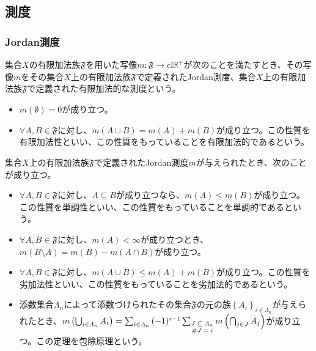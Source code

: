 \documentclass[dvipdfmx]{jsarticle}
\begin{document}
\subsection{測度}%
\subsubsection{Jordan測度}%
\begin{axs}[Jordan測度の公理]
集合$X$の有限加法族$\mathfrak{F}$を用いた写像$m:\mathfrak{F \rightarrow}\mathrm{cl}\mathbb{R}^{+}$が次のことを満たすとき、その写像$m$をその集合$X$上の有限加法族$\mathfrak{F}$で定義されたJordan測度、集合$X$上の有限加法族$\mathfrak{F}$で定義された有限加法的な測度という。
\begin{itemize}
\item
  $m(\emptyset) = 0$が成り立つ。
\item
  $\forall A,B \in \mathfrak{F}$に対し、$m(A \sqcup B) = m(A) + m(B)$が成り立つ。この性質を有限加法性といい、この性質をもっていることを有限加法的であるという。
\end{itemize}
\end{axs}
\begin{thm}\label{4.5.3.1}
集合$X$上の有限加法族$\mathfrak{F}$で定義されたJordan測度$m$が与えられたとき、次のことが成り立つ。
\begin{itemize}
\item
  $\forall A,B \in \mathfrak{F}$に対し、$A \subseteq B$が成り立つなら、$m(A) \leq m(B)$が成り立つ。この性質を単調性といい、この性質をもっていることを単調的であるという。
\item
  $\forall A,B \in \mathfrak{F}$に対し、$m(A) < \infty$が成り立つとき、$m(B \setminus A) = m(B) - m(A \cap B)$が成り立つ。
\item
  $\forall A,B \in \mathfrak{F}$に対し、$m(A \cup B) \leq m(A) + m(B)$が成り立つ。この性質を劣加法性といい、この性質をもっていることを劣加法的であるという。
\item
  添数集合$\varLambda_{n}$によって添数づけられたその集合$\mathfrak{F}$の元の族$\left\{ A_{i} \right\}_{i \in \varLambda_{n} }$が与えられたとき、$m\left( \bigcup_{i \in \varLambda_{n}} A_{i} \right) = \sum_{i \in \varLambda_{n} } {( - 1)^{i - 1}\sum_{\scriptsize \begin{matrix}
  J \subseteq \varLambda_{n} \\
  \#J = i \\
  \end{matrix}} {m\left( \bigcap_{j \in J} A_{j} \right)}}$が成り立つ。この定理を包除原理という。
\end{itemize}
\end{thm}
\end{document}
